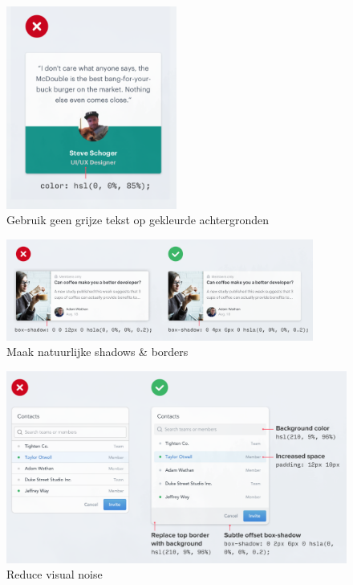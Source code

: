 \documentclass{article}
\begin{document}
\begin{figure}[H]
    \centering
    \includegraphics[width=0.5\textwidth]{img/Screenshot_20200302_092010.png}
    \caption{Gebruik geen grijze tekst op gekleurde achtergronden}
\end{figure}

\begin{figure}[H]
    \centering
    \includegraphics[width=0.9\textwidth]{img/Screenshot_20200302_092158.png}
    \caption{Maak natuurlijke shadows \& borders}
\end{figure}

\begin{figure}[H]
    \centering
    \includegraphics[width=\textwidth]{img/Screenshot_20200302_093450.png}
    \caption{Reduce visual noise}
\end{figure}
\end{document}
